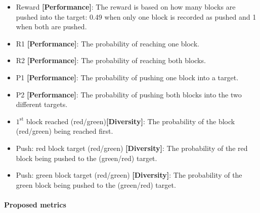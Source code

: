 \begin{itemize}
    \item Reward \textbf{[Performance]}: The reward is based on how many blocks are pushed into the target: 0.49 when only one block is recorded as pushed and 1 when both are pushed.
    \item R1 \textbf{[Performance]}: The probability of reaching one block.
    \item R2 \textbf{[Performance]}: The probability of reaching both blocks.
    \item P1 \textbf{[Performance]}: The probability of pushing one block into a target.
    \item P2 \textbf{[Performance]}: The probability of pushing both blocks into the two different targets.
    \item $1^{\text{st}}$ block reached (red/green)\textbf{[Diversity]}: The probability of the block (red/green) being reached first.
    \item Push: red block target (red/green) \textbf{[Diversity]}: The probability of the red block being  pushed to the (green/red) target. 
    \item Push: green block target (red/green) \textbf{[Diversity]}: The probability of the green block being  pushed to the (green/red) target. 
\end{itemize}

\paragraph{Proposed metrics}

